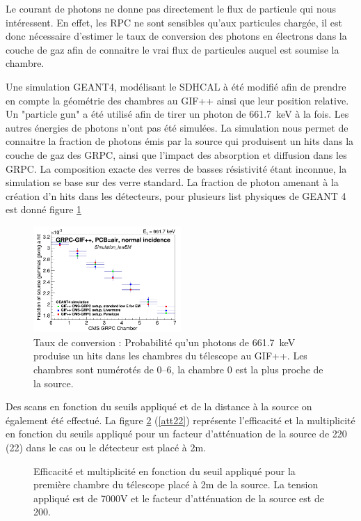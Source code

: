 Le courant de photons ne donne pas directement le flux de particule qui nous intéressent. En effet, les RPC ne sont sensibles qu'aux particules chargée, il est donc nécessaire d'estimer le taux de conversion des photons en électrons dans la couche de gaz afin de connaitre le vrai flux de particules auquel est soumise la chambre. 

Une simulation GEANT4, modélisant le SDHCAL à été modifié afin de prendre en compte la géométrie des chambres au GIF++ ainsi que leur position relative. Un "particle gun" a été utilisé afin de tirer un photon de \SI{661.7}{\kilo\eV} à la fois. Les autres énergies de photons n'ont pas été simulées. La simulation nous permet de connaitre la fraction de photons émis par la source qui produisent un hits dans la couche de gaz des GRPC, ainsi que l'impact des absorption et diffusion dans les GRPC. La composition exacte des verres de basses résistivité étant inconnue, la simulation se base sur des verre standard. La fraction de photon amenant à la création d'n hits dans les détecteurs, pour plusieurs list physiques de GEANT 4 est donné figure \ref{conversion}

\begin{figure}[!ht]
	\centering
	\includegraphics[width=0.50\textwidth]{GLA/taux.png}
	\caption{Taux de conversion : Probabilité qu'un photons de \SI{661.7}{\kilo\eV} produise un hits dans les chambres du télescope au GIF++. Les chambres sont numérotés de \SIrange{0}{6}{}, la chambre \num{0} est la plus proche de la source.}
	\label{conversion}
\end{figure}

Des scans en fonction du seuils appliqué et de la distance à la source on également été effectué. La figure \ref{att200} (\ref{att22}) représente l'efficacité et la multiplicité en fonction du seuils appliqué pour un facteur d'atténuation de la source de 220 (22) dans le cas ou le détecteur est placé à 2m.

\begin{figure}[ht!]
	\centering
	\hfill
	\caption{Efficacité et multiplicité en fonction du seuil appliqué pour la première chambre du télescope placé à 2m de la source. La tension appliqué est de 7000V et le facteur d'atténuation de la source est de 200.}
	\label{att200}
\end{figure}


